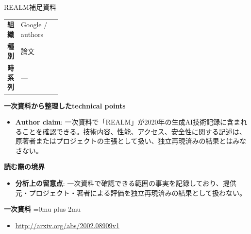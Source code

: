 \begin{technicalnote}{REALM}{補足資料}
\begingroup
\begin{tabularx}{\linewidth}{@{}>{\bfseries}p{0.22\linewidth}X@{}}
組織 & Google / authors \\
種別 & 論文 \\
時系列 & — \\
\end{tabularx}
\smallskip
{\bfseries 一次資料から整理したtechnical points}
\begin{itemize}[leftmargin=1.5em,itemsep=0.35em]
\item \textbf{Author claim}: 一次資料で「REALM」が2020年の生成AI技術記録に含まれることを確認できる。技術内容、性能、アクセス、安全性に関する記述は、原著者またはプロジェクトの主張として扱い、独立再現済みの結果とはみなさない。
\end{itemize}
\begin{minipage}{\linewidth}
{\bfseries 読む際の境界}
\begin{itemize}[leftmargin=1.5em,itemsep=0.35em]
\item \textbf{分析上の留意点}: 一次資料で確認できる範囲の事実を記録しており、提供元・プロジェクト・著者による評価を独立再現済みの結果として扱わない。
\end{itemize}
\begin{samepage}
{\bfseries 一次資料}
\begingroup\sloppy
\Urlmuskip=0mu plus 2mu\relax
\begin{itemize}[leftmargin=1.5em,itemsep=0.25em]
\item {\scriptsize\url{http://arxiv.org/abs/2002.08909v1}}
\end{itemize}
\endgroup
\end{samepage}
\end{minipage}
\endgroup
\end{technicalnote}
\medskip
